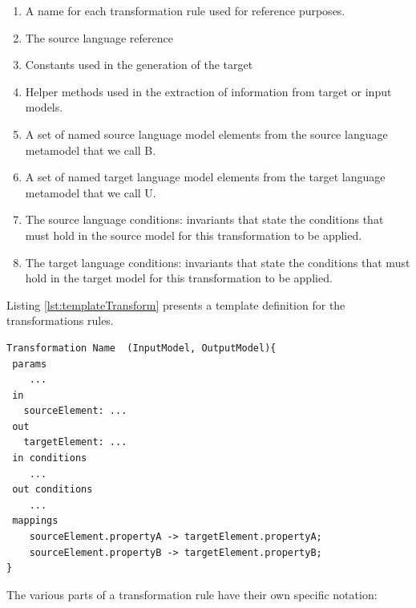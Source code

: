 \begin{enumerate}

\item A name for each transformation rule used for reference purposes.

\item The source language reference

\item Constants used in the generation of the target

\item Helper methods used in the extraction of information from target or input models.

\item A set of named source language model elements from the source language metamodel that we call B.

\item A set of named target language model elements from the target language metamodel that we call U.

\item The source language conditions: invariants that state the conditions that must hold in the source model for this transformation to be applied.

\item The target language conditions: invariants that state the conditions that must hold in the target model for this transformation to be applied.

\end{enumerate}


Listing \ref{lst:templateTransform} presents a template definition for the transformations rules.

\begin{lstlisting}[style=mine,caption=Template definition for Transformation rules,label=lst:templateTransform]
Transformation Name  (InputModel, OutputModel){
 params
 	...
 in
   sourceElement: ...
 out
   targetElement: ...
 in conditions
    ...
 out conditions
 	...
 mappings
    sourceElement.propertyA -> targetElement.propertyA;
    sourceElement.propertyB -> targetElement.propertyB;
}
\end{lstlisting}

The various parts of a transformation rule have their own  specific notation:

